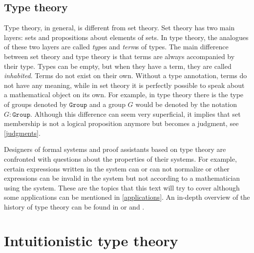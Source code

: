 \documentclass[12pt,a4paper,twoside,xetex]{book} %
\newcommand{\keyword}[1]{\emph{#1}\index{#1}}
\newcommand{\op}[1]{\mathtt{#1}}
\begin{document}




\subsection{Type theory}

Type theory, in general, is different from set theory. Set theory has two main layers: sets and propositions about elements of sets. In type theory, the analogues of these two layers are called \keyword{type}s and \keyword{term}s of types. The main difference between set theory and type theory is that terms are always accompanied by their type. Types can be empty, but when they have a term, they are called \keyword{inhabited}. Terms do not exist on their own. Without a type annotation, terms do not have any meaning, while in set theory it is perfectly possible to speak about a mathematical object on its own. For example, in type theory there is the type of groups denoted by $\op{Group}$ and a group $G$ would be denoted by the notation $G : \op{Group}$. Although this difference can seem very superficial, it implies that set membership is not a logical proposition anymore but becomes a judgment, see \cref{judgments}.

Designers of formal systems and proof assistants based on type theory are confronted with questions about the properties of their systems. For example, certain expressions written in the system can or can not normalize or other expressions can be invalid in the system but not according to a mathematician using the system. These are the topics that this text will try to cover although some applications can be mentioned in \cref{applications}. An in-depth overview of the history of type theory can be found in \cite{Coquand2013oct} or \cite{Constable2011} and \cite{Constable2015July}.


\section{Intuitionistic type theory}
\end{document}
